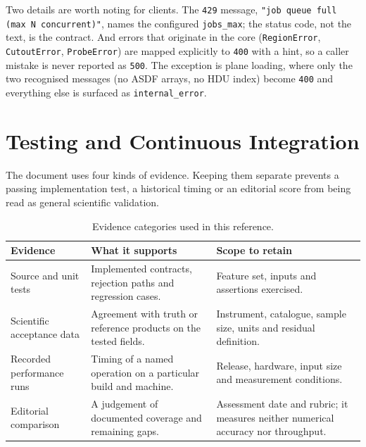 \documentclass[11pt,a4paper]{article}
\newcommand{\code}[1]{\texttt{\small #1}}
\begin{document}
    Two details are worth noting for clients. The \code{429} message, \code{"job queue full (max N concurrent)"}, names the configured \code{jobs\_max}; the status code, not the text, is the contract. And errors that originate in the core (\code{RegionError}, \code{CutoutError}, \code{ProbeError}) are mapped explicitly to \code{400} with a hint, so a caller mistake is never reported as \code{500}. The exception is plane loading, where only the two recognised messages (no ASDF arrays, no HDU index) become \code{400} and everything else is surfaced as \code{internal\_error}.


    \section{Testing and Continuous Integration}
    \label{sec:testing}

    The document uses four kinds of evidence. Keeping them separate prevents a passing implementation test, a historical timing or an editorial score from being read as general scientific validation.

    \begin{table}[H]
    \centering
    \small
    \begin{tabularx}{\textwidth}{p{3.6cm}XX}
    \toprule
    \textbf{Evidence} & \textbf{What it supports} & \textbf{Scope to retain} \\
    \midrule
    Source and unit tests & Implemented contracts, rejection paths and regression cases. & Feature set, inputs and assertions exercised. \\
    Scientific acceptance data & Agreement with truth or reference products on the tested fields. & Instrument, catalogue, sample size, units and residual definition. \\
    Recorded performance runs & Timing of a named operation on a particular build and machine. & Release, hardware, input size and measurement conditions. \\
    Editorial comparison & A judgement of documented coverage and remaining gaps. & Assessment date and rubric; it measures neither numerical accuracy nor throughput. \\
    \bottomrule
    \end{tabularx}
    \caption{Evidence categories used in this reference.}
    \end{table}
\end{document}
